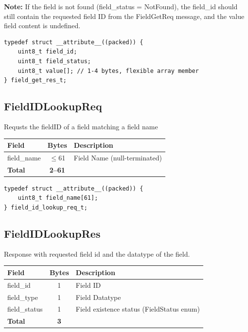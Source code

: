 \textbf{Note:} If the field is not found (field\_status = NotFound), the field\_id should still contain the requested field ID from the FieldGetReq message, and the value field content is undefined.


\begin{lstlisting}[caption={FieldGetRes struct}]
typedef struct __attribute__((packed)) {
    uint8_t field_id;
    uint8_t field_status;
    uint8_t value[]; // 1-4 bytes, flexible array member
} field_get_res_t;
\end{lstlisting}


\subsection{FieldIDLookupReq}\label{struct:FieldIDLookupReq}
Requsts the fieldID of a field matching a field name

\begin{center}
\begin{tabular}{l c l}
\toprule
Field & Bytes & Description \\
\midrule
field\_name & $\leq$61 & Field Name (null-terminated) \\
\midrule
\textbf{Total} & \textbf{2--61} & \\
\bottomrule
\end{tabular}
\end{center}


\begin{lstlisting}[caption={FieldIDLookupReq struct}]
typedef struct __attribute__((packed)) {
    uint8_t field_name[61];
} field_id_lookup_req_t;
\end{lstlisting}

\subsection{FieldIDLookupRes}\label{struct:FieldIDLookupRes}
Response with requested field id and the datatype of the field.
\\
\begin{center}
\begin{tabular}{l c l}
\toprule
Field & Bytes & Description \\
\midrule
field\_id & 1 & Field ID \\
field\_type & 1 & Field Datatype\\
field\_status & 1 & Field existence status (FieldStatus enum) \\
\midrule
\textbf{Total} & \textbf{3} & \\
\bottomrule
\end{tabular}
\end{center}

